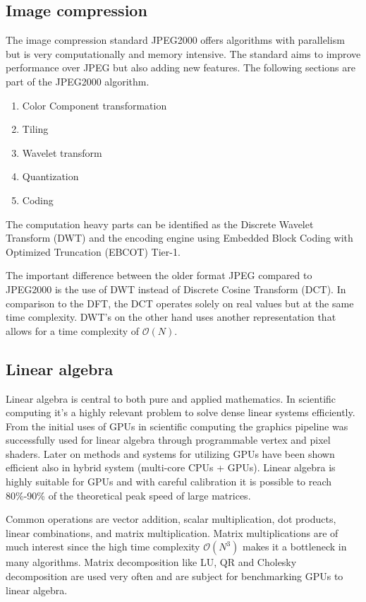\subsection{Image compression}
The image compression standard JPEG2000 offers algorithms with parallelism but is very computationally and memory intensive. The standard aims to improve performance over JPEG but also adding new features. The following sections are part of the JPEG2000 algorithm\cite{Christopoulos2000}.
\begin{enumerate}
	\item Color Component transformation
	\item Tiling
	\item Wavelet transform
	\item Quantization
	\item Coding
\end{enumerate}

The computation heavy parts can be identified as the Discrete Wavelet Transform (DWT) and the encoding engine using Embedded Block Coding with Optimized Truncation (EBCOT) Tier-1.

The important difference between the older format JPEG compared to JPEG2000 is the use of DWT instead of Discrete Cosine Transform (DCT). In comparison to the DFT, the DCT operates solely on real values but at the same time complexity. DWT's on the other hand uses another representation that allows for a time complexity of $\mathcal{O}(N)$.

\subsection{Linear algebra}
Linear algebra is central to both pure and applied mathematics. In scientific computing it's a highly relevant problem to solve dense linear systems efficiently. From the initial uses of GPUs in scientific computing the graphics pipeline was successfully used for linear algebra through programmable vertex and pixel shaders\cite{Kruger2003}. Later on methods and systems for utilizing GPUs have been shown efficient also in hybrid system (multi-core CPUs + GPUs)\cite{Tomov2010}. Linear algebra is highly suitable for GPUs and with careful calibration it is possible to reach 80\%-90\% of the theoretical peak speed of large matrices\cite{Volkov2008}.

Common operations are vector addition, scalar multiplication, dot products, linear combinations, and matrix multiplication. Matrix multiplications are of much interest since the high time complexity $\mathcal{O}(N^3)$ makes it a bottleneck in many algorithms. Matrix decomposition like LU, QR and Cholesky decomposition are used very often and are subject for benchmarking GPUs to linear algebra\cite{Volkov2008}.

